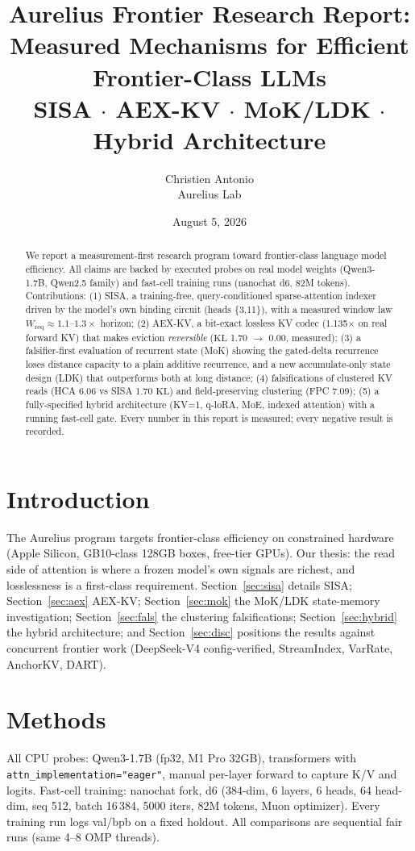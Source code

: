 \documentclass[11pt]{article}
\title{\textbf{Aurelius Frontier Research Report:\\Measured Mechanisms for Efficient Frontier-Class LLMs\\
SISA $\cdot$ AEX-KV $\cdot$ MoK/LDK $\cdot$ Hybrid Architecture}}
\author{Christien Antonio \\ Aurelius Lab}
\date{August 5, 2026}
\newcommand{\sisa}{SISA}
\newcommand{\kl}{\mathrm{KL}}
\begin{document}
\maketitle

\begin{abstract}
We report a measurement-first research program toward frontier-class language
model efficiency. All claims are backed by executed probes on real model
weights (Qwen3-1.7B, Qwen2.5 family) and fast-cell training runs (nanochat
d6, 82M tokens). Contributions: (1) \sisa{}, a training-free, query-conditioned
sparse-attention indexer driven by the model's own binding circuit (heads
\{3,11\}), with a measured window law $W_{\mathrm{req}} \approx 1.1$--$1.3
\times$ horizon; (2) AEX-KV, a bit-exact lossless KV codec (1.135$\times$ on
real forward KV) that makes eviction \emph{reversible} ($\kl$ 1.70
$\rightarrow$ 0.00, measured); (3) a falsifier-first evaluation of recurrent
state (MoK) showing the gated-delta recurrence loses distance capacity to a
plain additive recurrence, and a new accumulate-only state design (LDK) that
outperforms both at long distance; (4) falsifications of clustered KV reads
(HCA 6.06 vs \sisa{} 1.70 $\kl$) and field-preserving clustering (FPC 7.09);
(5) a fully-specified hybrid architecture (KV=1, q-loRA, MoE, indexed
attention) with a running fast-cell gate. Every number in this report is
measured; every negative result is recorded.
\end{abstract}

\tableofcontents

\section{Introduction}
\label{sec:intro}
The Aurelius program targets frontier-class efficiency on constrained
hardware (Apple Silicon, GB10-class 128GB boxes, free-tier GPUs). Our thesis:
the read side of attention is where a frozen model's own signals are richest,
and losslessness is a first-class requirement. Section~\ref{sec:sisa} details
\sisa{}; Section~\ref{sec:aex} AEX-KV; Section~\ref{sec:mok} the MoK/LDK
state-memory investigation; Section~\ref{sec:fals} the clustering
falsifications; Section~\ref{sec:hybrid} the hybrid architecture; and
Section~\ref{sec:disc} positions the results against concurrent frontier
work (DeepSeek-V4 config-verified, StreamIndex, VarRate, AnchorKV, DART).

\section{Methods}
\label{sec:methods}
All CPU probes: Qwen3-1.7B (fp32, M1 Pro 32GB), transformers with
\texttt{attn\_implementation="eager"}, manual per-layer forward to capture
K/V and logits. Fast-cell training: nanochat fork, d6 (384-dim, 6 layers,
6 heads, 64 head-dim, seq 512, batch 16\,384, 5000 iters, 82M tokens,
Muon optimizer). Every training run logs val/bpb on a fixed holdout. All
comparisons are sequential fair runs (same 4--8 OMP threads).
\end{document}
